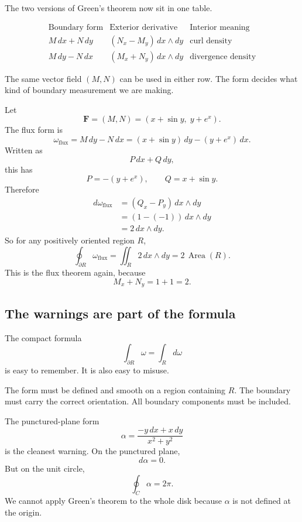 The two versions of Green's theorem now sit in one table.

\[
\begin{array}{c|c|c}
\text{Boundary form} & \text{Exterior derivative} & \text{Interior meaning}\\ \hline
M\,dx+N\,dy
&
(N_x-M_y)\,dx\wedge dy
&
\text{curl density}\\[1mm]
M\,dy-N\,dx
&
(M_x+N_y)\,dx\wedge dy
&
\text{divergence density}
\end{array}
\]

The same vector field \((M,N)\) can be used in either row.  The form decides what
kind of boundary measurement we are making.

\begin{example}
Let
\[
    \mathbf F=(M,N)=(x+\sin y,\;y+e^x).
\]
The flux form is
\[
    \omega_{\mathrm{flux}}=M\,dy-N\,dx
    =
    (x+\sin y)\,dy-(y+e^x)\,dx.
\]
Written as
\[
    P\,dx+Q\,dy,
\]
this has
\[
    P=-(y+e^x),
    \qquad
    Q=x+\sin y.
\]
Therefore
\[
\begin{aligned}
d\omega_{\mathrm{flux}}
&=
(Q_x-P_y)\,dx\wedge dy\\
&=
(1-(-1))\,dx\wedge dy\\
&=
2\,dx\wedge dy.
\end{aligned}
\]
So for any positively oriented region \(R\),
\[
    \oint_{\partial R}\omega_{\mathrm{flux}}
    =
    \iint_R 2\,dx\wedge dy
    =
    2\,\operatorname{Area}(R).
\]
This is the flux theorem again, because
\[
    M_x+N_y=1+1=2.
\]
\end{example}

\subsection{The warnings are part of the formula}

The compact formula
\[
    \int_{\partial R}\omega=\int_R d\omega
\]
is easy to remember.  It is also easy to misuse.

The form must be defined and smooth on a region containing \(R\).  The boundary must
carry the correct orientation.  All boundary components must be included.

The punctured-plane form
\[
    \alpha=\frac{-y\,dx+x\,dy}{x^2+y^2}
\]
is the cleanest warning.  On the punctured plane,
\[
    d\alpha=0.
\]
But on the unit circle,
\[
    \oint_C \alpha=2\pi.
\]
We cannot apply Green's theorem to the whole disk because \(\alpha\) is not defined at
the origin.

